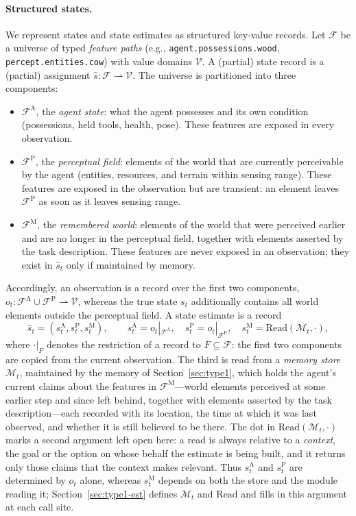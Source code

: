 \documentclass[11pt]{article}
\newcommand{\calF}{\mathcal{F}}
\newcommand{\calV}{\mathcal{V}}
\newcommand{\calM}{\mathcal{M}}
\newcommand{\shat}{\hat{s}}
\newcommand{\sA}{s^{\mathrm{A}}}
\newcommand{\sP}{s^{\mathrm{P}}}
\newcommand{\sM}{s^{\mathrm{M}}}
\newcommand{\FA}{\calF^{\mathrm{A}}}
\newcommand{\FP}{\calF^{\mathrm{P}}}
\newcommand{\FM}{\calF^{\mathrm{M}}}
\newcommand{\Read}{\mathrm{Read}}
\begin{document}
\paragraph{Structured states.}
We represent states and state estimates as structured key-value records. Let $\calF$ be a universe of typed \emph{feature paths} (e.g., \texttt{agent.possessions.wood}, \texttt{percept.entities.cow}) with value domains $\calV$. A (partial) state record is a (partial) assignment $\shat:\calF\rightharpoonup\calV$.
The universe is partitioned into three components:
\begin{itemize}[leftmargin=1.5em,itemsep=1pt]
\item $\FA$, the \emph{agent state}: what the agent possesses and its own condition (possessions, held tools, health, pose). These features are exposed in every observation.
\item $\FP$, the \emph{perceptual field}: elements of the world that are currently perceivable by the agent (entities, resources, and terrain within sensing range). These features are exposed in the observation but are transient: an element leaves $\FP$ as soon as it leaves sensing range.
\item $\FM$, the \emph{remembered world}: elements of the world that were perceived earlier and are no longer in the perceptual field, together with elements asserted by the task description. These features are never exposed in an observation; they exist in $\shat_t$ only if maintained by memory.
\end{itemize}
Accordingly, an observation is a record over the first two components, $o_t:\FA\cup\FP\rightharpoonup\calV$, whereas the true state $s_t$ additionally contains all world elements outside the perceptual field.
A state estimate is a record
\begin{equation}
\shat_t=(\sA_t,\sP_t,\sM_t),\qquad \sA_t=o_t|_{\FA},\quad \sP_t=o_t|_{\FP},\quad 
\sM_t=\Read(\calM_t,\cdot),
\label{eq:state-estimate}
\end{equation}
where $\cdot|_{F}$ denotes the restriction of a record to $F\subseteq\calF$: the first two components are copied from the current observation. The third is read from a \emph{memory store} $\calM_t$, maintained by the memory of Section~\ref{sec:type1}, which holds the agent's current claims about the features in $\FM$---world elements perceived at some earlier step and since left behind, together with elements asserted by the task description---each recorded with its location, the time at which it was last observed, and whether it is still believed to be there. The dot in $\Read(\calM_t,\cdot)$ marks a second argument left open here: a read is always relative to a \emph{context}, the goal or the option on whose behalf the estimate is being built, and it returns only those claims that the context makes relevant. Thus $\sA_t$ and $\sP_t$ are determined by $o_t$ alone, whereas $\sM_t$ depends on both the store and the module reading it; Section~\ref{sec:type1-est} defines $\calM_t$ and $\Read$ and fills in this argument at each call site.
\end{document}
